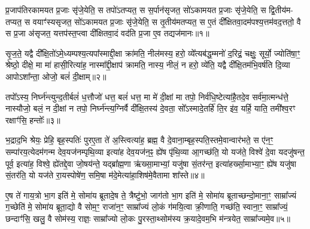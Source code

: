 {}

\setcounter{anuvakam}{0}
प्र॒जाप॑तिरकामयत प्र॒जाः सृ॑जे॒येति॒ स तपो॑\-ऽतप्यत॒ स स॒र्पान॑सृजत॒ सो॑\-ऽकामयत प्र॒जाः सृ॑जे॒येति॒ स द्वि॒तीय॑म- तप्यत॒ स वयाꣳ॑स्यसृजत॒ सो॑\-ऽकामयत प्र॒जाः सृ॑जे॒येति॒ स तृ॒तीय॑मतप्यत॒ स ए॒तं दी᳚क्षितवा॒दम॑पश्य॒त्तम॑वद॒त्ततो॒ वै स प्र॒जा अ॑सृजत॒ यत्तप॑स्त॒प्त्वा दी᳚क्षितवा॒दं वद॑ति प्र॒जा ए॒व तद्यज॑मानः॥१॥

सृ॒ज॒ते॒ यद्वै दी᳚क्षि॒तो॑\-ऽमे॒ध्यम्पश्य॒त्यपा᳚स्माद्दी॒क्षा क्रा॑मति॒ नील॑मस्य॒ हरो॒ व्ये᳚त्यब॑द्ध॒म्मनो॑ द॒रिद्रं॒ चक्षुः॒ सूर्यो॒ ज्योति॑षा॒ꣳ॒ श्रेष्ठो॒ दीक्षे॒ मा मा॑ हासी॒रित्या॑ह॒ नास्मा᳚द्दी॒क्षाप॑ क्रामति॒ नास्य॒ नीलं॒ न हरो॒ व्ये॑ति॒ यद्वै दी᳚क्षि॒तम॑भि॒वर्\mbox{}ष॑ति दि॒व्या आपो\-ऽशा᳚न्ता॒ ओजो॒ बलं॑ दी॒क्षाम्॥२॥

तपो᳚\-ऽस्य॒ निर्घ्न॑न्त्युन्द॒तीर्बलं॑ ध॒त्तौजो॑ धत्त॒ बलं॑ धत्त॒ मा मे॑ दी॒क्षां मा तपो॒ निर्व॑धि॒ष्टेत्या॑है॒तदे॒व सर्व॑मा॒त्मन्ध॑त्ते॒ नास्यौजो॒ बलं॒ न दी॒क्षां न तपो॒ निर्घ्न॑न्त्य॒ग्निर्वै दी᳚क्षि॒तस्य॑ दे॒वता॒ सो᳚\-ऽस्मादे॒तर्\mbox{}हि॑ ति॒र इ॑व॒ यर्\mbox{}हि॒ याति॒ तमी᳚श्व॒रꣳ रक्षाꣳ॑सि॒ हन्तोः᳚॥३॥

भ॒द्राद॒भि श्रेयः॒ प्रेहि॒ बृह॒स्पतिः॑ पुरए॒ता ते॑ अ॒स्त्वित्या॑ह॒ ब्रह्म॒ वै दे॒वाना॒म्बृह॒स्पति॒स्तमे॒वान्वार॑भते॒ स ए॑न॒ꣳ॒ सम्पा॑रय॒त्येदम॑गन्म देव॒यज॑नम्पृथि॒व्या इत्या॑ह देव॒यज॑न॒ꣴ॒ ह्ये॑ष पृ॑थि॒व्या आ॒गच्छ॑ति॒ यो यज॑ते॒ विश्वे॑ दे॒वा यदजु॑षन्त॒ पूर्व॒ इत्या॑ह॒ विश्वे॒ ह्ये॑तद्दे॒वा जो॒षय॑न्ते॒ यद्ब्रा᳚ह्म॒णा ऋ॑ख्सा॒माभ्यां॒ यजु॑षा सं॒तर॑न्त॒ इत्या॑हर्ख्सा॒माभ्या॒ꣳ॒ ह्ये॑ष यजु॑षा सं॒तर॑ति॒ यो यज॑ते रा॒यस्पोषे॑ण॒ समि॒षा म॑दे॒मेत्या॑हा॒शिष॑मे॒वैतामा शा᳚स्ते॥४॥

{\anuvakamend[{यज॑मानो दी॒क्षाꣳ हन्तो᳚र्ब्राह्म॒णाश्चतु॑र्विꣳशतिश्च॥१॥}]}

ए॒ष ते॑ गाय॒त्रो भा॒ग इति॑ मे॒ सोमा॑य ब्रूतादे॒ष ते॒ त्रैष्टु॑भो॒ जाग॑तो भा॒ग इति॑ मे॒ सोमा॑य ब्रूताच्छन्दो॒माना॒ꣳ॒ साम्रा᳚ज्यं ग॒च्छेति॑ मे॒ सोमा॑य ब्रूता॒द्यो वै सोम॒ꣳ॒ राजा॑न॒ꣳ॒ साम्रा᳚ज्यं लो॒कं ग॑मयि॒त्वा क्री॒णाति॒ गच्छ॑ति॒ स्वाना॒ꣳ॒ साम्रा᳚ज्यं॒ छन्दाꣳ॑सि॒ खलु॒ वै सोम॑स्य॒ राज्ञः॒ साम्रा᳚ज्यो लो॒कः पु॒रस्ता॒थ्सोम॑स्य क्र॒यादे॒वम॒भि म॑न्त्रयेत॒ साम्रा᳚ज्यमे॒व॥५॥

